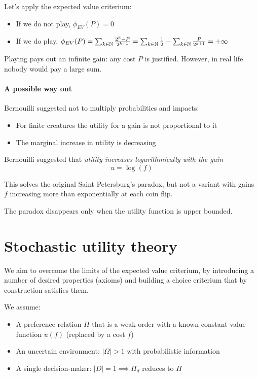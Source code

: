 Let's apply the expected value criterium:
\begin{itemize}
	\item If we do not play, $\phi_{EV} (P) = 0$
	
	\item If we do play, $\phi_{EV} (P) = \sum_{k \in \operatorname{\mathbb{N}}} \frac{2^k - P}{2^{k+1}} = \sum_{k \in \operatorname{\mathbb{N}}} \frac{1}{2} - \sum_{k \in \operatorname{\mathbb{N}}} \frac{P}{2^{k+1}} = + \infty$
\end{itemize}

Playing pays out an infinite gain: any cost $P$ is justified. However, in real life nobody would pay a large sum.

\paragraph{A possible way out} Bernouilli suggested not to multiply probabilities and impacts: 
\begin{itemize}
	\item For finite creatures the utility for a gain is not proportional to it
	
	\item The marginal increase in utility is decreasing
\end{itemize}

Bernouilli suggested that \textit{utility increases logarithmically with the gain}
$$ u = \log (f) $$

This solves the original Saint Petersburg's paradox, but not a variant with gains $f$ increasing more than exponentially at each coin flip.

The paradox disappears only when the utility function is upper bounded.


\section{Stochastic utility theory}
\label{sec:stochastic}

We aim to overcome the limits of the expected value criterium, by introducing a number of desired properties (axioms) and building a choice criterium that by construction satisfies them. 

We assume:
\begin{itemize}
	\item A preference relation $\Pi$ that is a weak order with a known constant value function $u(f)$ (replaced by a cost $f$)
	
	\item An uncertain environment: $|\Omega| > 1$ with probabilistic information
	
	\item A single decision-maker: $|D| = 1 \implies \Pi_d$ reduces to $\Pi$
\end{itemize}

